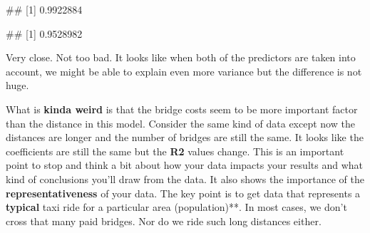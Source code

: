 \documentclass[
]{book}
\newenvironment{Shaded}{\begin{snugshade}}{\end{snugshade}}
\newcommand{\CommentTok}[1]{\textcolor[rgb]{0.56,0.35,0.01}{\textit{#1}}}
\newcommand{\FunctionTok}[1]{\textcolor[rgb]{0.13,0.29,0.53}{\textbf{#1}}}
\newcommand{\NormalTok}[1]{#1}
\newcommand{\OtherTok}[1]{\textcolor[rgb]{0.56,0.35,0.01}{#1}}
\newcommand{\SpecialCharTok}[1]{\textcolor[rgb]{0.81,0.36,0.00}{\textbf{#1}}}
\begin{document}
\begin{Shaded}
\end{Shaded}

\begin{Shaded}
\begin{Highlighting}[]
\NormalTok{\#\# [1] 0.9922884}
\end{Highlighting}
\end{Shaded}

\begin{Shaded}
\end{Shaded}

\begin{Shaded}
\begin{Highlighting}[]
\NormalTok{\#\# [1] 0.9528982}
\end{Highlighting}
\end{Shaded}

Very close. Not too bad. It looks like when both of the predictors are taken into account, we might be able to explain even more variance but the difference is not huge.

What is \textbf{kinda weird} is that the bridge costs seem to be more important factor than the distance in this model. Consider the same kind of data except now the distances are longer and the number of bridges are still the same. It looks like the coefficients are still the same but the \textbf{R2} values change. This is an important point to stop and think a bit about how your data impacts your results and what kind of conclusions you'll draw from the data. It also shows the importance of the \textbf{representativeness} of your data. The key point is to get data that represents a \textbf{typical} taxi ride for a particular area (population)**. In most cases, we don't cross that many paid bridges. Nor do we ride such long distances either.

\begin{Shaded}
\end{Shaded}
\end{document}
